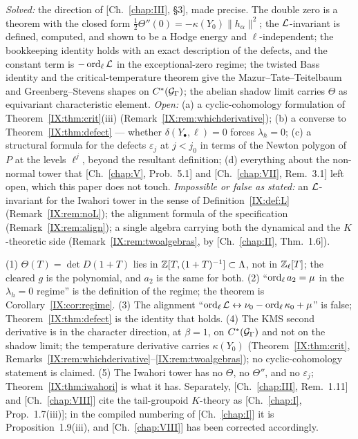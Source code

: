 \begin{remark}\label{IX:rem:scope}
\emph{Solved:} the direction of [Ch.~\ref{chap:III}, \S3], made precise. The double zero is a theorem
with the closed form $\frac12\Theta''(0)=-\kappa(Y_0)\|h_\alpha\|^{2}$; the $\mathcal{L}$-invariant
is defined, computed, and shown to be a Hodge energy and $\ell$-independent; the
bookkeeping identity holds with an exact description of the defects, and the constant
term is $-\operatorname{ord}_\ell\mathcal{L}$ in the exceptional-zero regime; the twisted Bass identity and
the critical-temperature theorem give the Mazur--Tate--Teitelbaum and
Greenberg--Stevens shapes on $C^*(\mathcal{G}_\Gamma)$; the abelian shadow limit carries
$\Theta$ as equivariant characteristic element. \emph{Open:} (a) a cyclic-cohomology
formulation of Theorem~\ref{IX:thm:crit}(iii) (Remark~\ref{IX:rem:whichderivative}); (b) a
converse to Theorem~\ref{IX:thm:defect} --- whether $\delta(Y_\bullet,\ell)=0$ forces
$\lambda_h=0$; (c) a structural formula for the defects $\varepsilon_j$ at $j<j_0$ in
terms of the Newton polygon of $P$ at the levels $\ell^{j}$, beyond the resultant
definition; (d) everything about the non-normal tower that [Ch.~\ref{chap:V}, Prob.~5.1] and
[Ch.~\ref{chap:VII}, Rem.~3.1] left open, which this paper does not touch. \emph{Impossible or
false as stated:} an $\mathcal{L}$-invariant for the Iwahori tower in the sense of
Definition~\ref{IX:def:L} (Remark~\ref{IX:rem:noL}); the alignment formula of the
specification (Remark~\ref{IX:rem:align}); a single algebra carrying both the dynamical
and the $K$-theoretic side (Remark~\ref{IX:rem:twoalgebras}, by [Ch.~\ref{chap:II}, Thm.~1.6]).
\end{remark}

\begin{remark}\label{IX:rem:corrections}
(1) $\Theta(T)=\det D(1+T)$ lies in $\mathbb{Z}[T,(1+T)^{-1}]\subset\Lambda$, not in $\mathbb{Z}_\ell[T]$; the
cleared $g$ is the polynomial, and $a_2$ is the same for both. (2)
``$\operatorname{ord}_\ell a_2=\mu$ in the $\lambda_h=0$ regime'' is the definition of the regime;
the theorem is Corollary~\ref{IX:cor:regime}. (3) The alignment
``$\operatorname{ord}_\ell\mathcal{L}\leftrightarrow\nu_0-\operatorname{ord}_\ell\kappa_0+\mu$'' is false;
Theorem~\ref{IX:thm:defect} is the identity that holds. (4) The KMS second derivative is in
the character direction, at $\beta=1$, on $C^*(\mathcal{G}_\Gamma)$ and not on the shadow limit;
the temperature derivative carries $\kappa(Y_0)$ (Theorem~\ref{IX:thm:crit},
Remarks~\ref{IX:rem:whichderivative}--\ref{IX:rem:twoalgebras}); no cyclic-cohomology
statement is claimed. (5) The Iwahori tower has no $\Theta$, no $\Theta''$, and no
$\varepsilon_j$; Theorem~\ref{IX:thm:iwahori} is what it has. Separately, [Ch.~\ref{chap:III}, Rem.~1.11]
and [Ch.~\ref{chap:VIII}] cite the tail-groupoid $K$-theory as [Ch.~\ref{chap:I}, Prop.~1.7(iii)]; in the compiled
numbering of [Ch.~\ref{chap:I}] it is Proposition~1.9(iii), and [Ch.~\ref{chap:VIII}] has been corrected accordingly.
\end{remark}

